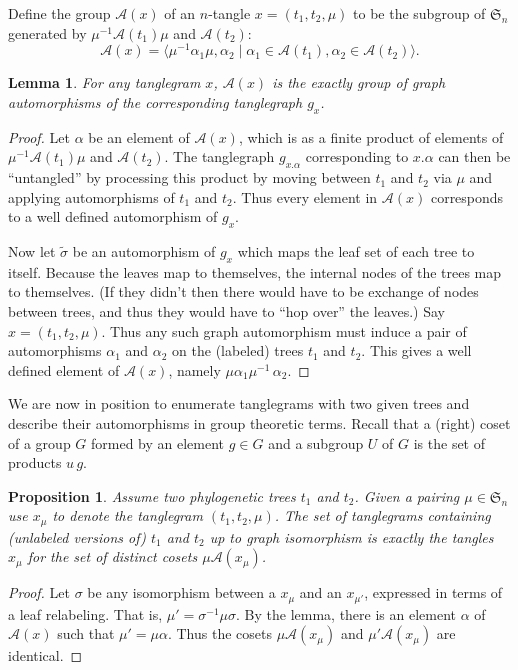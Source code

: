 \documentclass{amsart}
\newtheorem{lemma}{Lemma}
\newtheorem{proposition}{Proposition}
\newcommand{\fS}{\mathfrak S}
\newcommand{\aut}{\mathcal A}
\newcommand{\pairing}{\mu}
\begin{document}
Define the group $\aut(x)$ of an $n$-tangle $x = (t_1, t_2, \pairing)$ to be the subgroup of $\fS_n$ generated by $\pairing^{-1} \aut(t_1) \pairing$ and $\aut(t_2)$:
\[
\aut(x) = \langle \pairing^{-1} \alpha_1 \pairing, \alpha_2 \mid \alpha_1 \in \aut(t_1), \alpha_2 \in \aut(t_2) \rangle.
\]

\begin{lemma}
For any tanglegram $x$, $\aut(x)$ is the exactly group of graph automorphisms of the corresponding tanglegraph $g_x$.
\end{lemma}
\begin{proof}
Let $\alpha$ be an element of $\aut(x)$, which is as a finite product of elements of $\pairing^{-1} \aut(t_1) \pairing$ and $\aut(t_2)$.
The tanglegraph $g_{x . \alpha}$ corresponding to $x . \alpha$ can then be ``untangled'' by processing this product by moving between $t_1$ and $t_2$ via $\pairing$ and applying automorphisms of $t_1$ and $t_2$.
Thus every element in $\aut(x)$ corresponds to a well defined automorphism of $g_x$.

Now let $\tilde \sigma$ be an automorphism of $g_x$ which maps the leaf set of each tree to itself.
Because the leaves map to themselves, the internal nodes of the trees map to themselves.
(If they didn't then there would have to be exchange of nodes between trees, and thus they would have to ``hop over'' the leaves.)
Say $x = (t_1, t_2, \pairing)$.
Thus any such graph automorphism must induce a pair of automorphisms $\alpha_1$ and $\alpha_2$ on the (labeled) trees $t_1$ and $t_2$.
This gives a well defined element of $\aut(x)$, namely $\pairing \alpha_1 \pairing^{-1} \, \alpha_2$.
\end{proof}

We are now in position to enumerate tanglegrams with two given trees and describe their automorphisms in group theoretic terms.
Recall that a (right) coset of a group $G$ formed by an element $g \in G$ and a subgroup $U$ of $G$ is the set of products $u\, g$.
\begin{proposition}
\label{prop:cosets}
Assume two phylogenetic trees $t_1$ and $t_2$.
Given a pairing $\pairing \in \fS_n$ use $x_\pairing$ to denote the tanglegram $(t_1, t_2, \pairing)$.
The set of tanglegrams containing (unlabeled versions of) $t_1$ and $t_2$ up to graph isomorphism is exactly the tangles $x_\pairing$ for the set of distinct cosets $\pairing \aut(x_\pairing)$.
\end{proposition}
\begin{proof}
Let $\sigma$ be any isomorphism between a $x_\pairing$ and an $x_{\pairing'}$, expressed in terms of a leaf relabeling.
That is, $\pairing' = \sigma^{-1} \pairing \sigma$.
By the lemma, there is an element $\alpha$ of $\aut(x)$ such that $\pairing' = \pairing \alpha$.
Thus the cosets $\pairing \aut(x_\pairing)$ and $\pairing' \aut(x_\pairing)$ are identical.
\end{proof}
\end{document}
